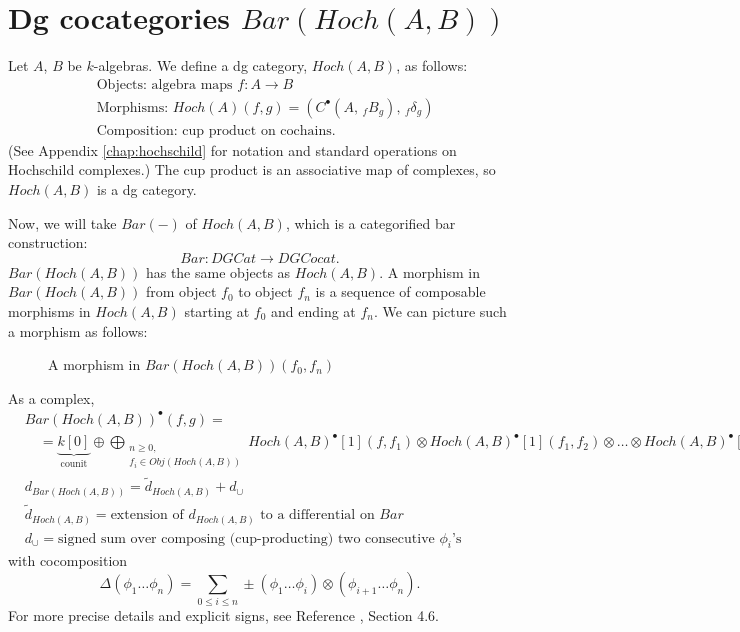 \section{Dg cocategories $Bar(Hoch(A,B))$} \label{sec:define_bar_hoch}
Let $A$, $B$ be $k$-algebras. We define 
a dg category, $Hoch(A,B)$, as follows:
\begin{align*}
	&\textrm{Objects: algebra maps } f:A \to B\\
	&\textrm{Morphisms: } 
	  Hoch(A)(f,g) = (C^\bullet(A,\, _fB_g),\, _f\delta_g)\\
	&\textrm{Composition: cup product on cochains.}
\end{align*}
(See Appendix \ref{chap:hochschild} for notation and 
standard operations on Hochschild complexes.) 
The cup product is an associative map of complexes, 
so $Hoch(A,B)$ is a dg category.

Now, we will take $Bar(-)$ of $Hoch(A,B)$, which 
is a categorified bar construction:
$$Bar: DGCat \to DGCocat.$$
$Bar(Hoch(A,B))$ has the same objects as 
$Hoch(A,B)$. A morphism in $Bar(Hoch(A,B))$ 
from object $f_0$ to object $f_n$ 
is a sequence of composable morphisms in 
$Hoch(A,B)$ starting at $f_0$ and ending at 
$f_n$. We can picture such a morphism as 
follows:
%
\begin{figure}[H]
\centerline{}
\caption{A morphism in $Bar(Hoch(A,B))(f_0,f_n)$}
\end{figure}
%
As a complex, 
\begin{align*}
&Bar(Hoch(A,B))^\bullet(f,g) 
=\\
&\quad = \underbrace{k[0]}_{\textrm{counit}} \oplus
\bigoplus \limits_{\substack{
	n \geq 0,\\
	f_i \in Obj(Hoch(A,B))}}
{\scriptstyle Hoch(A,B)^\bullet[1](f,f_1) \otimes 
Hoch(A,B)^\bullet[1](f_1,f_2) \otimes \dots \otimes 
Hoch(A,B)^\bullet[1](f_n,g)}\\
%
& d_{Bar(Hoch(A,B))} = 
\tilde{d}_{Hoch(A,B)} + d_\cup\\
%
& \tilde{d}_{Hoch(A,B)} =
\textrm{extension of $d_{Hoch(A,B)}$ 
to a differential on $Bar$}\\
%
& d_\cup = 
\textrm{signed sum over composing (cup-producting) 
two consecutive $\phi_i$'s}
\end{align*}
with cocomposition
$$\Delta(\phi_1\dots \phi_n) = 
\sum \limits_{0 \leq i \leq n}
\pm (\phi_1 \dots \phi_i) \otimes (\phi_{i+1}\dots \phi_n).$$
%
For more precise details and explicit signs, 
see Reference \cite{T}, Section 4.6.